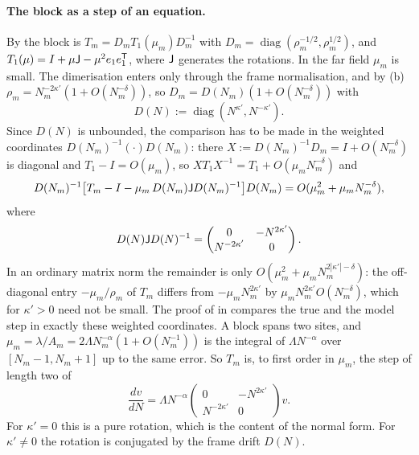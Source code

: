 \paragraph{The block as a step of an equation.} By  the block is
$T_m=D_mT_1(\mu_m)D_m^{-1}$ with $D_m=\operatorname{diag}(\rho_m^{-1/2},\rho_m^{1/2})$, and
$T_1(\mu)=I+\mu\mathsf{J}-\mu^2e_1e_1^{\mathsf T}$, where $\mathsf{J}$ generates the rotations. In the far
field $\mu_m$ is small. The dimerisation enters only through the frame normalisation, and by
(b) $\rho_m=N_m^{-2\kappa'}(1+O(N_m^{-\delta}))$, so
$D_m=D(N_m)(1+O(N_m^{-\delta}))$ with
\[
  D(N):=\operatorname{diag}(N^{\kappa'},N^{-\kappa'}).
\]
Since $D(N)$ is unbounded, the comparison has to be made in the weighted coordinates
$D(N_m)^{-1}(\cdot)D(N_m)$: there $X:=D(N_m)^{-1}D_m=I+O(N_m^{-\delta})$ is diagonal and $T_1-I=O(\mu_m)$,
so $X T_1X^{-1}=T_1+O(\mu_mN_m^{-\delta})$ and
\[
  D(N_m)^{-1}\bigl[T_m-I-\mu_m\,D(N_m)\mathsf{J} D(N_m)^{-1}\bigr]D(N_m)=O(\mu_m^2+\mu_mN_m^{-\delta}),
\]
where
\[
  D(N)\mathsf{J} D(N)^{-1}=\begin{pmatrix}0&-N^{2\kappa'}\\N^{-2\kappa'}&0\end{pmatrix}.
\]
In an ordinary matrix norm the remainder is only $O(\mu_m^2+\mu_mN_m^{2|\kappa'|-\delta})$: the
off-diagonal entry $-\mu_m/\rho_m$ of $T_m$ differs from $-\mu_mN_m^{2\kappa'}$ by $\mu_mN_m^{2\kappa'}O(N_m^{-\delta})$,
which for $\kappa'>0$ need not be small. The proof of  in 
compares the true and the model step in exactly these weighted coordinates.
A block spans two sites, and $\mu_m=\lambda/A_m=2\Lambda N_m^{-\alpha}(1+O(N_m^{-1}))$ is the integral of
$\Lambda N^{-\alpha}$ over $[N_m-1,N_m+1]$ up to the same error. So $T_m$ is, to first order in
$\mu_m$, the step of length two of
\begin{equation}\label{eq:bessel-system}
  \frac{dv}{dN}=\Lambda N^{-\alpha}\begin{pmatrix}0&-N^{2\kappa'}\\N^{-2\kappa'}&0\end{pmatrix}v .
\end{equation}
For $\kappa'=0$ this is a pure rotation, which is the content of the normal form. For
$\kappa'\ne0$ the rotation is conjugated by the frame drift $D(N)$.

